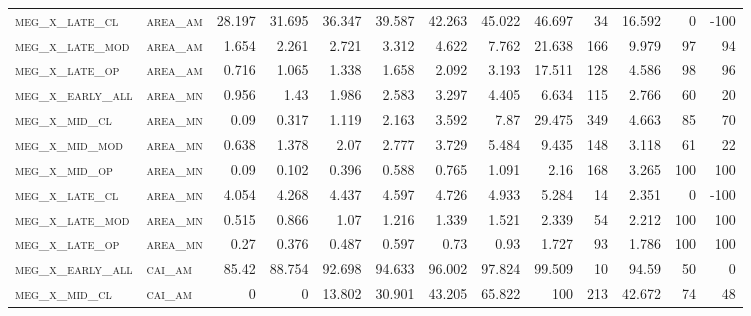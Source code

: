 \begin{landscape}
\begin{center}
\begin{footnotesize}
\begin{longtable}{llrrrrrrrr|rrr}
\textsc{meg\_x\_late\_cl  } & \textsc{area\_am  }   & 28.197   & 31.695   & 36.347   & 39.587   & 42.263   & 45.022   & 46.697    & 34     & 16.592        & 0             & -100            \\
\textsc{meg\_x\_late\_mod } & \textsc{area\_am  }   & 1.654    & 2.261    & 2.721    & 3.312    & 4.622    & 7.762    & 21.638    & 166    & 9.979         & 97            & 94              \\
\textsc{meg\_x\_late\_op  } & \textsc{area\_am  }   & 0.716    & 1.065    & 1.338    & 1.658    & 2.092    & 3.193    & 17.511    & 128    & 4.586         & 98            & 96              \\
\textsc{meg\_x\_early\_all} & \textsc{area\_mn  }   & 0.956    & 1.43     & 1.986    & 2.583    & 3.297    & 4.405    & 6.634     & 115    & 2.766         & 60            & 20              \\
\textsc{meg\_x\_mid\_cl   } & \textsc{area\_mn  }   & 0.09     & 0.317    & 1.119    & 2.163    & 3.592    & 7.87     & 29.475    & 349    & 4.663         & 85            & 70              \\
\textsc{meg\_x\_mid\_mod  } & \textsc{area\_mn  }   & 0.638    & 1.378    & 2.07     & 2.777    & 3.729    & 5.484    & 9.435     & 148    & 3.118         & 61            & 22              \\
\textsc{meg\_x\_mid\_op   } & \textsc{area\_mn  }   & 0.09     & 0.102    & 0.396    & 0.588    & 0.765    & 1.091    & 2.16      & 168    & 3.265         & 100           & 100             \\
\textsc{meg\_x\_late\_cl  } & \textsc{area\_mn  }   & 4.054    & 4.268    & 4.437    & 4.597    & 4.726    & 4.933    & 5.284     & 14     & 2.351         & 0             & -100            \\
\textsc{meg\_x\_late\_mod } & \textsc{area\_mn  }   & 0.515    & 0.866    & 1.07     & 1.216    & 1.339    & 1.521    & 2.339     & 54     & 2.212         & 100           & 100             \\
\textsc{meg\_x\_late\_op  } & \textsc{area\_mn  }   & 0.27     & 0.376    & 0.487    & 0.597    & 0.73     & 0.93     & 1.727     & 93     & 1.786         & 100           & 100             \\
\textsc{meg\_x\_early\_all} & \textsc{cai\_am   }   & 85.42    & 88.754   & 92.698   & 94.633   & 96.002   & 97.824   & 99.509    & 10     & 94.59         & 50            & 0               \\
\textsc{meg\_x\_mid\_cl   } & \textsc{cai\_am   }   & 0        & 0        & 13.802   & 30.901   & 43.205   & 65.822   & 100       & 213    & 42.672        & 74            & 48              \\

\end{longtable}
\end{footnotesize}
\end{center}
\end{landscape}
